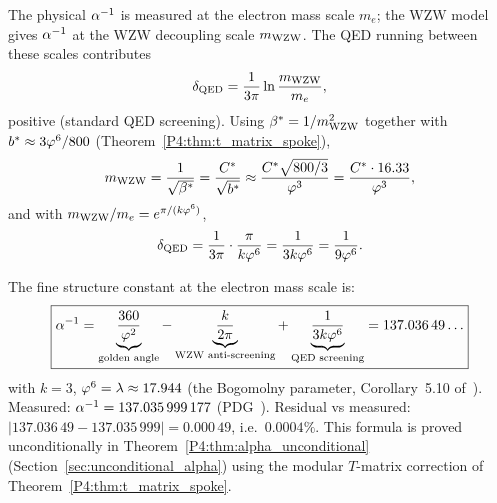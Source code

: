 The physical $\alpha^{-1}$ is measured at the electron mass scale $m_e$; the
WZW model gives $\alpha^{-1}$ at the WZW decoupling scale $m_{\mathrm{WZW}}$.  The QED
running between these scales contributes
\begin{equation}
  \delta_\text{QED} = \frac{1}{3\pi}\ln\frac{m_{\mathrm{WZW}}}{m_e},
  \label{P4:eq:delta_qed}
\end{equation}
positive (standard QED screening).  Using $\beta^{*}=1/m_{\mathrm{WZW}}^2$ together
with $b^*\approx 3\varphi^6/800$ (Theorem~\ref{P4:thm:t_matrix_spoke}),
\begin{equation}
  m_{\mathrm{WZW}} = \frac{1}{\sqrt{\beta^{*}}} = \frac{C^*}{\sqrt{b^*}}
  \approx \frac{C^*\sqrt{800/3}}{\varphi^3} = \frac{C^*\cdot 16.33}{\varphi^3},
  \label{P4:eq:mwzw_from_b}
\end{equation}
and with $m_{\mathrm{WZW}}/m_e=e^{\pi/(k\varphi^6)}$,
\begin{equation}
  \delta_\text{QED}
  = \frac{1}{3\pi}\cdot\frac{\pi}{k\varphi^6}
  = \frac{1}{3k\varphi^6}
  = \frac{1}{9\varphi^6}.
  \label{P4:eq:delta_exact}
\end{equation}

\begin{theorem}
\label{P4:thm:three_term_alpha}
The fine structure constant at the electron mass scale is:
\begin{equation}
  \boxed{
  \alpha^{-1}
  = \underbrace{\frac{360}{\varphi^2}}_{\text{golden angle}}
  - \underbrace{\frac{k}{2\pi}}_{\text{WZW anti-screening}}
  + \underbrace{\frac{1}{3k\varphi^6}}_{\text{QED screening}}
  = 137.036\,49\ldots
  }
  \label{P4:eq:three_term}
\end{equation}
with $k=3$, $\varphi^6 = \lambda \approx 17.944$ (the Bogomolny parameter,
Corollary~5.10 of~\cite{Paper1}).  Measured: $\alpha^{-1} = 137.035\,999\,177$
(PDG~\cite{PDG2024}).  Residual vs measured: $|137.036\,49 - 137.035\,999| = 0.000\,49$,
i.e.\ $0.0004\%$.  This formula is proved unconditionally in
Theorem~\ref{P4:thm:alpha_unconditional} (Section~\ref{sec:unconditional_alpha})
using the modular $T$-matrix correction of Theorem~\ref{P4:thm:t_matrix_spoke}.
\end{theorem}


